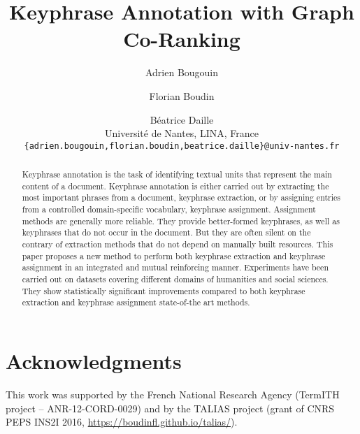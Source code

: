 \documentclass[11pt,a4paper]{article}
\title{Keyphrase Annotation with Graph Co-Ranking}
\author{
  Adrien Bougouin \and Florian Boudin \and Béatrice Daille\\
  Université de Nantes, LINA, France\\
  {\normalsize\tt \{adrien.bougouin,florian.boudin,beatrice.daille\}@univ-nantes.fr}\\
}
\date{}
\begin{document}
  \maketitle
  
  \begin{abstract}
    Keyphrase annotation is the task of identifying textual units that represent the main content of a document.
    Keyphrase annotation is either carried out by extracting the most important phrases from a document, keyphrase extraction, or by assigning entries from a controlled domain-specific vocabulary, keyphrase assignment.
    Assignment methods are generally more reliable.
    They provide better-formed keyphrases, as well as keyphrases that do not occur in the document.
    But they are often silent on the contrary of extraction methods that do not depend on manually built resources.
    This paper proposes a new method to perform both keyphrase extraction and keyphrase assignment in an integrated and mutual reinforcing manner.
    Experiments have been carried out on datasets covering different domains of humanities and social sciences.
    They show statistically significant improvements compared to both keyphrase extraction and keyphrase assignment state-of-the art methods.
  \end{abstract}
    
  
  
  
  
  
  
  
  
  \section*{Acknowledgments}
  This work was supported by the French National Research Agency (TermITH project – ANR-12-CORD-0029) and by the TALIAS project (grant of CNRS PEPS INS2I 2016, \url{https://boudinfl.github.io/talias/}).

  
  
\end{document}
